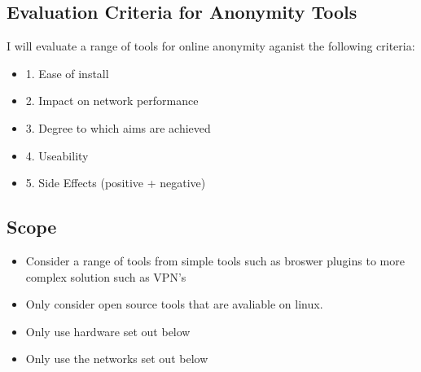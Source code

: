 \documentclass[12pt,a4paper,oneside]{article}
\begin{document}
\subsection{Evaluation Criteria for Anonymity Tools}
I will evaluate a range of tools for online anonymity aganist the following criteria:
\begin{itemize}
\item	1. Ease of install
\item	2. Impact on network performance
\item	3. Degree to which aims are achieved 
\item	4. Useability
\item	5. Side Effects (positive + negative)
\end{itemize}

\subsection{Scope}
\begin{itemize}
\item Consider a range of tools from simple tools such as broswer plugins to more complex solution such as VPN's
\item Only consider open source tools that are avaliable on linux. %
\item Only use hardware set out below
\item Only use the networks set out below
\end{itemize}
\end{document}
